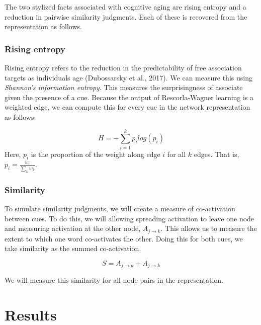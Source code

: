 \documentclass[
  man]{apa6}
\begin{document}
The two stylized facts associated with cognitive aging are rising entropy and a reduction in pairwise similarity judgments. Each of these is recovered from the representation as follows.

\hypertarget{rising-entropy}{%
\subsubsection{Rising entropy}\label{rising-entropy}}

Rising entropy refers to the reduction in the predictability of free association targets as individuals age (Dubossarsky et al., 2017). We can measure this using \emph{Shannon's information entropy}. This measures the surprisingness of associate given the presence of a cue. Because the output of Rescorla-Wagner learning is a weighted edge, we can compute this for every cue in the network representation as follows:

\[
H = -\sum_{i=1}^{k}  p_i log(p_i)
\]
Here, \(p_i\) is the proportion of the weight along edge \(i\) for all \(k\) edges. That is, \(p_i = \frac{w_i}{\sum_k w_k}\).

\hypertarget{similarity}{%
\subsubsection{Similarity}\label{similarity}}

To simulate similarity judgments, we will create a measure of co-activation between cues. To do this, we will allowing spreading activation to leave one node and measuring activation at the other node, \(A_{j \rightarrow k}\). This allows us to measure the extent to which one word co-activates the other. Doing this for both cues, we take similarity as the summed co-activation.

\[
S = A_{j \rightarrow k} + A_{j \rightarrow k}
\]

We will measure this similarity for all node pairs in the representation.

\hypertarget{results}{%
\section{Results}\label{results}}
\end{document}
